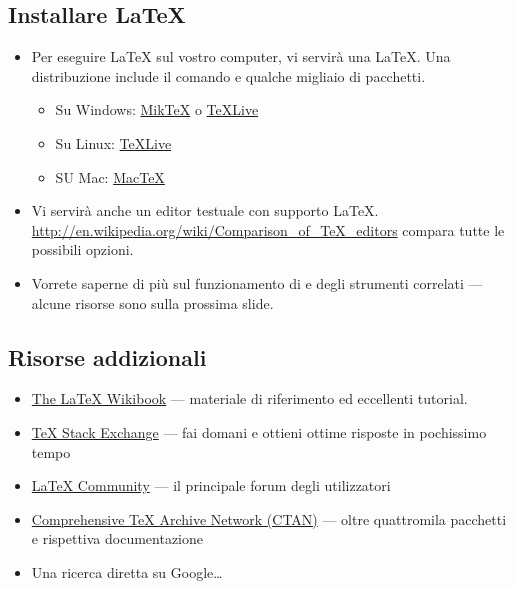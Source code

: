 \documentclass{beamer}
\begin{document}
\subsection{Installare \LaTeX{}}
\begin{frame}{\insertsubsection}
\begin{itemize}
\item Per eseguire \LaTeX{} sul vostro computer, vi servir\`a una  \LaTeX{}. Una distribuzione include il comando  
e qualche migliaio di pacchetti.
\begin{itemize}
\item Su Windows: \href{http://miktex.org/}{Mik\TeX} o \href{http://tug.org/texlive/}{\TeX Live}
\item Su Linux: \href{http://tug.org/texlive/}{\TeX Live}
\item SU Mac: \href{http://tug.org/mactex/}{Mac\TeX}
\end{itemize}
\item Vi servir\`a anche un editor testuale con supporto \LaTeX{}. \url{http://en.wikipedia.org/wiki/Comparison_of_TeX_editors} compara tutte le possibili opzioni.
\item Vorrete saperne di pi\`u sul funzionamento di  e degli strumenti
correlati --- alcune risorse sono sulla prossima slide.
\end{itemize}
\end{frame}

\subsection{Risorse addizionali}
\begin{frame}{\insertsubsection}
\begin{itemize}
\item \href{http://en.wikibooks.org/wiki/LaTeX}{The \LaTeX{} Wikibook} ---
materiale di riferimento ed eccellenti tutorial.
\item \href{http://tex.stackexchange.com/}{\TeX{} Stack Exchange} --- fai domani e ottieni ottime risposte in pochissimo tempo
\item \href{http://www.latex-community.org/}{\LaTeX{} Community} --- il principale forum degli utilizzatori
\item \href{http://ctan.org/}{Comprehensive \TeX{} Archive Network (CTAN)} ---
oltre quattromila pacchetti e rispettiva documentazione
\item Una ricerca diretta su Google\ldots
\end{itemize}
\end{frame}
\end{document}
